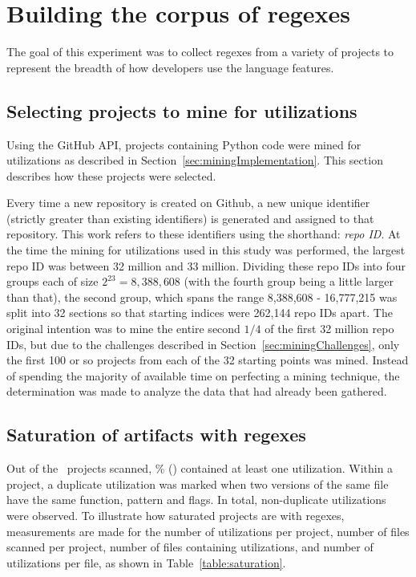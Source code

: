 \section{Building the corpus of regexes}
\label{sec:corpusBuilding}

The goal of this experiment was to collect regexes from a variety of projects to represent the breadth of how developers use the language features.

\subsection{Selecting projects to mine for utilizations}
Using the GitHub API,  projects containing Python code were mined for utilizations as described in Section~\ref{sec:miningImplementation}.  This section describes how these projects were selected.

Every time a new repository is created on Github, a new unique identifier (strictly greater than existing identifiers) is generated and assigned to that repository.  This work refers to these identifiers using the shorthand: \emph{repo ID}.  At the time the mining for utilizations used in this study was performed, the largest repo ID was between 32 million and 33 million.  Dividing these repo IDs into four groups each of size $2^23 = 8,388,608$ (with the fourth group being a little larger than that), the second group, which spans the range 8,388,608 - 16,777,215 was split into 32 sections so that starting indices were 262,144 repo IDs apart.  The original intention was to mine the entire second $1/4$ of the first 32 million repo IDs, but due to the challenges described in Section~\ref{sec:miningChallenges}, only the first 100 or so projects from each of the 32 starting points was mined.  Instead of spending the majority of available time on perfecting a mining technique, the determination was made to analyze the data that had already been gathered.



\subsection{Saturation of artifacts with regexes}
Out of the \ projects scanned, \% () contained at least one utilization.  Within a project, a duplicate utilization was marked when two versions of the same file have the same function, pattern and flags.  In total,  non-duplicate utilizations were observed.  To illustrate how saturated projects are with regexes, measurements are made for the number of utilizations per project, number of files scanned per project, number of files containing utilizations, and number of utilizations  per file, as shown in Table~\ref{table:saturation}.

